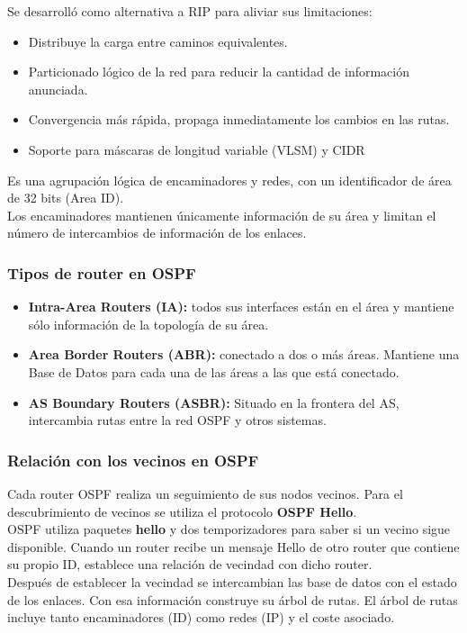 \begin{onepage}
    Se desarrolló como alternativa a RIP para aliviar sus limitaciones:
    \begin{itemize}
        \item Distribuye la carga entre caminos equivalentes.
        \item Particionado lógico de la red para reducir la cantidad de información anunciada.
        \item Convergencia más rápida, propaga inmediatamente los cambios en las rutas.
        \item Soporte para máscaras de longitud variable (VLSM) y CIDR
    \end{itemize}
    \begin{tcolorbox}[
    title=Área,
    colback=blue!5!white,
    colframe=blue!75!black,
    fonttitle=\bfseries]
    Es una agrupación lógica de encaminadores y redes, con un identificador de área de 32 bits (Area ID).\\
    
    Los encaminadores mantienen únicamente información de su área y limitan el número de intercambios de información de los enlaces.
    \end{tcolorbox}
    \subsubsection{Tipos de router en OSPF}
    \begin{itemize}
    \item \textbf{Intra-Area Routers (IA): }todos sus interfaces están en el área y mantiene sólo información de la topología de su área.
    \item \textbf{Area Border Routers (ABR): }conectado a dos o más áreas. Mantiene una Base de Datos para cada una de las áreas a las que está conectado.
    \item \textbf{AS Boundary Routers (ASBR): } Situado en la frontera del AS, intercambia rutas entre la red OSPF y otros sistemas.
    \end{itemize}
    \subsubsection{Relación con los vecinos en OSPF}
    Cada router OSPF realiza un seguimiento de sus nodos vecinos. Para el descubrimiento de vecinos se utiliza el protocolo \textbf{OSPF Hello}.\\
    
    OSPF utiliza paquetes \textbf{hello} y dos temporizadores para saber si un vecino sigue disponible. Cuando un router recibe un mensaje Hello de otro router que contiene su propio ID, establece una relación de vecindad con dicho router.\\
    
    Después de establecer la vecindad se intercambian las base de datos con el
    estado de los enlaces. Con esa información construye su árbol de rutas. El árbol de rutas incluye tanto encaminadores (ID) como redes (IP) y el coste
    asociado.
\end{onepage}

